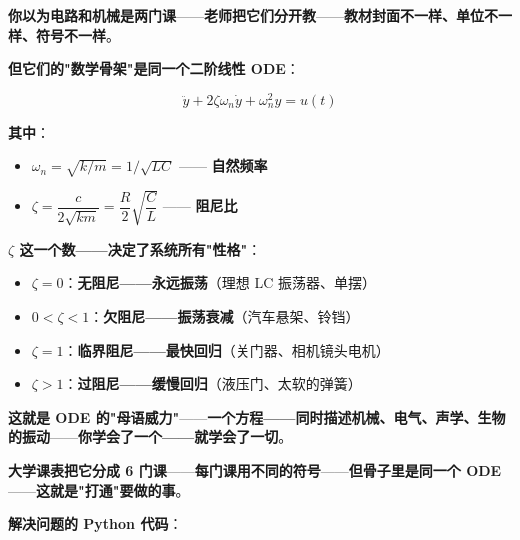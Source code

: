 \begin{tcolorbox}[ahabox={Aha: 同一个 ODE——同时是机械振动 和 电路滤波}]
\textbf{你以为电路和机械是两门课}——\textbf{老师把它们分开教}——\textbf{教材封面不一样、单位不一样、符号不一样}。

\medskip

\textbf{但它们的"数学骨架"是同一个二阶线性 ODE}：

\[
\ddot{y} + 2\zeta \omega_n \dot{y} + \omega_n^2 y = u(t)
\]

\textbf{其中}：
\begin{itemize}
\item $\omega_n = \sqrt{k/m} = 1/\sqrt{LC}$ —— \textbf{自然频率}
\item $\zeta = \dfrac{c}{2\sqrt{km}} = \dfrac{R}{2}\sqrt{\dfrac{C}{L}}$ —— \textbf{阻尼比}
\end{itemize}

\medskip

\textbf{$\zeta$ 这一个数——决定了系统所有"性格"}：

\begin{itemize}
\item $\zeta = 0$：\textbf{无阻尼——永远振荡}（理想 LC 振荡器、单摆）
\item $0 < \zeta < 1$：\textbf{欠阻尼——振荡衰减}（汽车悬架、铃铛）
\item $\zeta = 1$：\textbf{临界阻尼——最快回归}（关门器、相机镜头电机）
\item $\zeta > 1$：\textbf{过阻尼——缓慢回归}（液压门、太软的弹簧）
\end{itemize}

\medskip

\textbf{这就是 ODE 的"母语威力"}——\textbf{一个方程——同时描述\textbf{机械、电气、声学、生物}的振动}——\textbf{你学会了一个——就学会了一切}。

\medskip

\textbf{大学课表把它分成 6 门课}——\textbf{每门课用不同的符号}——\textbf{但骨子里是同一个 ODE}——\textbf{这就是"打通"要做的事}。
\end{tcolorbox}

\textbf{解决问题的 Python 代码}：


